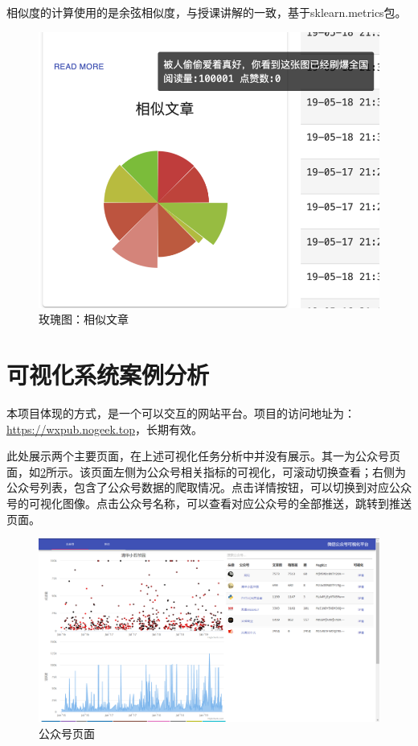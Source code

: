 \documentclass[a4paper,12pt]{article}
\begin{document}
    相似度的计算使用的是余弦相似度，与授课讲解的一致，基于sklearn.metrics包。
    \begin{figure}
      \centering
      \includegraphics[width=0.5\linewidth]{mgt.png}
      \caption{玫瑰图：相似文章}
      \label{fig:mgt}
    \end{figure}
    \section{可视化系统案例分析}
    本项目体现的方式，是一个可以交互的网站平台。项目的访问地址为：\url{https://wxpub.nogeek.top}，长期有效。

    此处展示两个主要页面，在上述可视化任务分析中并没有展示。其一为公众号页面，如\cref{fig:zym}所示。该页面左侧为公众号相关指标的可视化，可滚动切换查看；右侧为公众号列表，包含了公众号数据的爬取情况。点击详情按钮，可以切换到对应公众号的可视化图像。点击公众号名称，可以查看对应公众号的全部推送，跳转到推送页面。
    \begin{figure}
      \centering
      \includegraphics[width=0.9\linewidth]{zym.png}
      \caption{公众号页面}
      \label{fig:zym}
    \end{figure}
\end{document}
